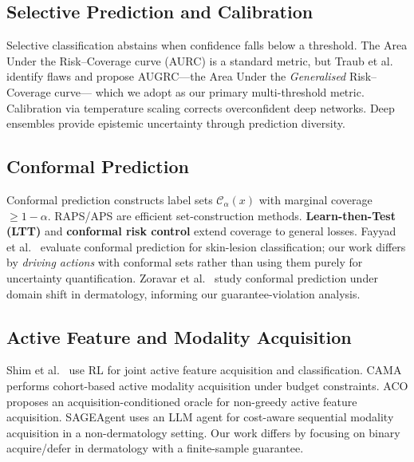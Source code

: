 \documentclass[conference]{IEEEtran}
\newcommand{\1}{\mathbf{1}}
\begin{document}
\subsection{Selective Prediction and Calibration}

Selective classification \cite{geifman2017selective} abstains when confidence
falls below a threshold. The Area Under the Risk--Coverage curve (AURC) is a
standard metric, but Traub et al.\ \cite{traub2024augrc} identify flaws and
propose AUGRC---the Area Under the \emph{Generalised} Risk--Coverage curve---
which we adopt as our primary multi-threshold metric. Calibration via
temperature scaling \cite{guo2017calibration} corrects overconfident deep
networks. Deep ensembles \cite{lakshminarayanan2017ensembles} provide
epistemic uncertainty through prediction diversity.

\subsection{Conformal Prediction}

Conformal prediction \cite{angelopoulos2021gentle} constructs label sets
$\mathcal{C}_\alpha(x)$ with marginal coverage $\geq 1-\alpha$. RAPS/APS
\cite{angelopoulos2020raps} are efficient set-construction methods.
\textbf{Learn-then-Test (LTT)} \cite{angelopoulos2021ltt} and
\textbf{conformal risk control} \cite{angelopoulos2022crc} extend coverage
to general losses. Fayyad et al.\ \cite{fayyad2023conformal} evaluate
conformal prediction for skin-lesion classification; our work differs by
\emph{driving actions} with conformal sets rather than using them purely for
uncertainty quantification. Zoravar et al.\ \cite{zoravar2025conformal}
study conformal prediction under domain shift in dermatology, informing our
guarantee-violation analysis.

\subsection{Active Feature and Modality Acquisition}

Shim et al.\ \cite{shim2018joint} use RL for joint active feature
acquisition and classification. CAMA \cite{rheude2025cama} performs
cohort-based active modality acquisition under budget constraints. ACO
\cite{valancius2023aco} proposes an acquisition-conditioned oracle for
non-greedy active feature acquisition. SAGEAgent \cite{sageagent2026} uses
an LLM agent for cost-aware sequential modality acquisition in a
non-dermatology setting. Our work differs by focusing on binary
acquire/defer in dermatology with a finite-sample guarantee.
\end{document}
